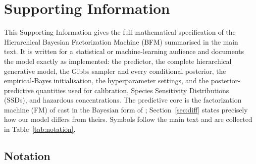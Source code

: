 %

\newcommand{\yhat}{\hat{y}}
\newcommand{\Norm}{\mathcal{N}}
\newcommand{\Gam}{\mathrm{Gamma}}
\newcommand{\Real}{\mathbb{R}}
\newcommand{\E}{\mathbb{E}}
\newcommand{\Var}{\mathrm{Var}}
\newcommand{\vv}{\mathbf{v}}
\newcommand{\xx}{\mathbf{x}}

\section{Supporting Information}
\label{sec:si}

This Supporting Information gives the full mathematical specification of the
Hierarchical Bayesian Factorization Machine (BFM) summarised in the main text.
It is written for a statistical or machine-learning audience and documents the
model exactly as implemented: the predictor, the complete hierarchical
generative model, the Gibbs sampler and every conditional posterior, the
empirical-Bayes initialisation, the hyperparameter settings, and the
posterior-predictive quantities used for calibration, Species Sensitivity
Distributions (SSDs), and hazardous concentrations. The predictive core is the
factorization machine (FM) of \citet{rendle2010fm} cast in the Bayesian form of
\citet{rendle2011bayesian}; Section~\ref{sec:diff} states precisely how our
model differs from theirs. Symbols follow the main text and are collected in
Table~\ref{tab:notation}.

\subsection{Notation}
\label{sec:notation}

